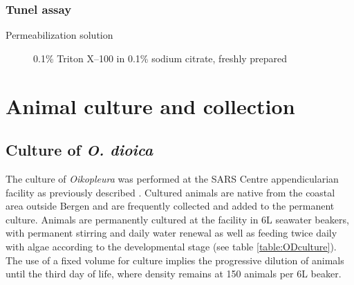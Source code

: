 \documentclass[11pt,twoside,a4paper]{report}
\begin{document}
			\subsubsection{Tunel assay}
			     \begin{description}
					\item[Permeabilization solution] 0.1\% Triton X–100 in 0.1\% sodium citrate, freshly prepared
				\end{description}
		    		    
		    
	\section{Animal culture and collection}
		\subsection{Culture of \textit{O. dioica}}
		The culture of \textit{Oikopleura} was performed at the SARS Centre appendicularian facility as previously described \cite{Bouquet2009}. Cultured animals are native from the coastal area outside Bergen and are frequently collected and added to the permanent culture. Animals are permanently cultured at the facility in 6L seawater beakers, with permanent stirring and daily water renewal as well as feeding twice daily with algae according to the developmental stage (see table \ref{table:ODculture}). The use of a fixed volume for culture implies the progressive dilution of animals until the third day of life, where density remains at 150 animals per 6L beaker.
		
\end{document}
